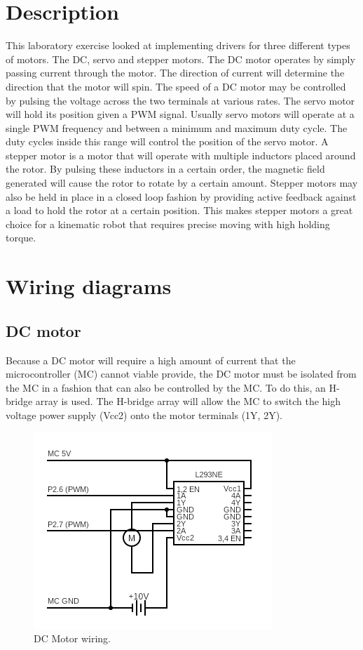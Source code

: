 \documentclass[CMPE]{../KGCOEReport}
\begin{document}
    \maketitle
    \section*{Description}

   	This laboratory exercise looked at implementing drivers for three different
   	types of motors. The DC, servo and stepper motors. The DC motor operates by
   	simply passing current through the motor. The direction of current will
   	determine the direction that the motor will spin. The speed of a DC motor
   	may be controlled by pulsing the voltage across the two terminals at various
   	rates. The servo motor will hold its position given a PWM signal. Usually servo
   	motors will operate at a single PWM frequency and between a minimum and maximum
   	duty cycle. The duty cycles inside this range will control the position of the
   	servo motor. A stepper motor is a motor that will operate with multiple inductors
   	placed around the rotor. By pulsing these inductors in a certain order, the magnetic
   	field generated will cause the rotor to rotate by a certain amount. Stepper motors
   	may also be held in place in a closed loop fashion by providing active feedback
   	against a load to hold the rotor at a certain position. This makes stepper motors
   	a great choice for a kinematic robot that requires precise moving with high holding
   	torque.

    \section*{Wiring diagrams}
    \subsection*{DC motor}

	Because a DC motor will require a high amount of current that the microcontroller (MC)
	cannot viable provide, the DC motor must be isolated from the MC in
	a fashion that can also be controlled by the MC. To do this, an H-bridge array is
	used. The H-bridge array will allow the MC to switch the high voltage power supply
	(Vcc2) onto the motor terminals (1Y, 2Y).

	\begin{figure}[ht]
	  \centering
	  \includegraphics[width=.6\linewidth]{circuit}
	  \caption{DC Motor wiring.}
	  \label{fig:dc}
	\end{figure}
\end{document}
